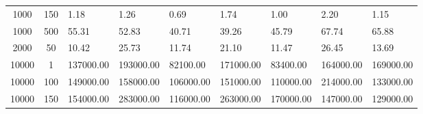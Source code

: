 \begin{table*}
\begin{center}
\begin{tabular}{cc|lllllll}
1000  & 150 & 1.18      & 1.26      & 0.69      & 1.74      & 1.00      & 2.20      & 1.15      \\
1000  & 500 & 55.31     & 52.83     & 40.71     & 39.26     & 45.79     & 67.74     & 65.88     \\
2000  & 50  & 10.42     & 25.73     & 11.74     & 21.10     & 11.47     & 26.45     & 13.69     \\
10000 & 1   & 137000.00 & 193000.00 & 82100.00  & 171000.00 & 83400.00  & 164000.00 & 169000.00 \\
10000 & 100 & 149000.00 & 158000.00 & 106000.00 & 151000.00 & 110000.00 & 214000.00 & 133000.00 \\
10000 & 150 & 154000.00 & 283000.00 & 116000.00 & 263000.00 & 170000.00 & 147000.00 & 129000.00 \\ \hline
\end{tabular}
\end{center}
\end{table*}


